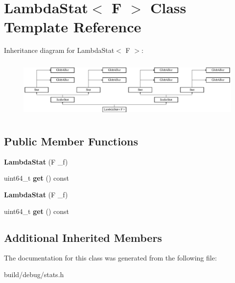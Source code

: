 \hypertarget{classLambdaStat}{\section{Lambda\-Stat$<$ F $>$ Class Template Reference}
\label{classLambdaStat}
}
Inheritance diagram for Lambda\-Stat$<$ F $>$\-:\begin{figure}[H]
\begin{center}
\leavevmode
\includegraphics[height=2.991453cm]{classLambdaStat}
\end{center}
\end{figure}
\subsection*{Public Member Functions}
\begin{DoxyCompactItemize}
\item 
\hypertarget{classLambdaStat_a44cd3edc94f7eb6988cde776471162af}{{\bfseries Lambda\-Stat} (F \-\_\-f)}\label{classLambdaStat_a44cd3edc94f7eb6988cde776471162af}

\item 
\hypertarget{classLambdaStat_a2d4a7954b0b878035202182cb1b8d2db}{uint64\-\_\-t {\bfseries get} () const }\label{classLambdaStat_a2d4a7954b0b878035202182cb1b8d2db}

\item 
\hypertarget{classLambdaStat_a44cd3edc94f7eb6988cde776471162af}{{\bfseries Lambda\-Stat} (F \-\_\-f)}\label{classLambdaStat_a44cd3edc94f7eb6988cde776471162af}

\item 
\hypertarget{classLambdaStat_a2d4a7954b0b878035202182cb1b8d2db}{uint64\-\_\-t {\bfseries get} () const }\label{classLambdaStat_a2d4a7954b0b878035202182cb1b8d2db}

\end{DoxyCompactItemize}
\subsection*{Additional Inherited Members}


The documentation for this class was generated from the following file\-:\begin{DoxyCompactItemize}
\item 
build/debug/stats.\-h\end{DoxyCompactItemize}
